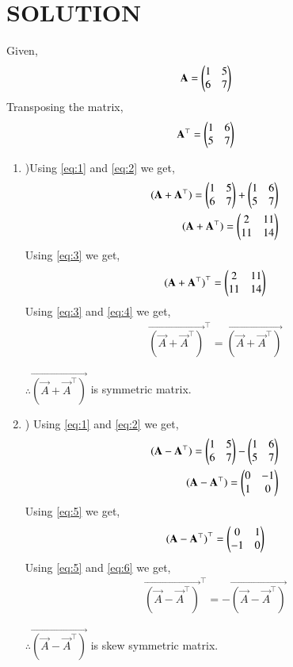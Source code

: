 \documentclass[journal,12pt,twocolumn]{IEEEtran}
\begin{document}
\section*{SOLUTION}
\begin{enumerate}
Given,
\begin{align}
\label{eq:1}
    \Vec{A}=\myvec{1 & 5\\6 & 7}
\end{align}
Transposing the matrix,
\begin{align}
    \label{eq:2}
    \Vec{A}^\top=\myvec{1 & 6 \\5 & 7}
\end{align}
\end{enumerate}
\begin{enumerate}[label=\roman*]
\item)Using \eqref{eq:1} and \eqref{eq:2} we get,
\begin{align}
\mathbf{(\mathbf{A}+\mathbf{A}^\top)}=\begin{pmatrix}1 & 5\\6 & 7\end{pmatrix}+\begin{pmatrix}1 & 6 \\5 & 7\end{pmatrix}\\
\label{eq:3}
\mathbf{(\mathbf{A}+\mathbf{A}^\top)}=\begin{pmatrix}2 & 11\\11 & 14\end{pmatrix}
\end{align}
Using \eqref{eq:3} we get,
\begin{align}
\label{eq:4}
\mathbf{(\mathbf{A}+\mathbf{A}^\top)}^\top=\begin{pmatrix}2 & 11\\11 & 14\end{pmatrix}
\end{align}
Using \eqref{eq:3} and \eqref{eq:4} we get,
\begin{align}
  \vec{(\vec{A}+\vec{A}^\top)}^\top=\vec{(\vec{A}+\vec{A}^\top)}
\end{align}
\begin{center}
    $\therefore \vec{(\vec{A}+\vec{A}^\top)}$ is symmetric matrix. 
\end{center}
\item)
Using \eqref{eq:1} and \eqref{eq:2} we get,
\begin{align}
\mathbf{(\mathbf{A}-\mathbf{A}^\top)}=\begin{pmatrix}1 & 5\\6 & 7\end{pmatrix}-\begin{pmatrix}1 & 6 \\5 & 7\end{pmatrix}\\
\label{eq:5}
\mathbf{(\mathbf{A}-\mathbf{A}^\top)}=\begin{pmatrix}0 & -1\\1 & 0\end{pmatrix}
\end{align}
Using \eqref{eq:5} we get,
\begin{align}
\label{eq:6}
\mathbf{(\mathbf{A}-\mathbf{A}^\top)}^\top=\begin{pmatrix}0 & 1\\-1 & 0\end{pmatrix}
\end{align}
Using \eqref{eq:5} and \eqref{eq:6} we get,
\begin{align}
 \vec{(\vec{A}-\vec{A}^\top)}^\top=- \vec{(\vec{A}-\vec{A}^\top)}
\end{align}
\begin{center}
    $\therefore \vec{(\vec{A}-\vec{A}^\top)}$ is skew symmetric matrix. 
\end{center}
\end{enumerate}
\end{document}
